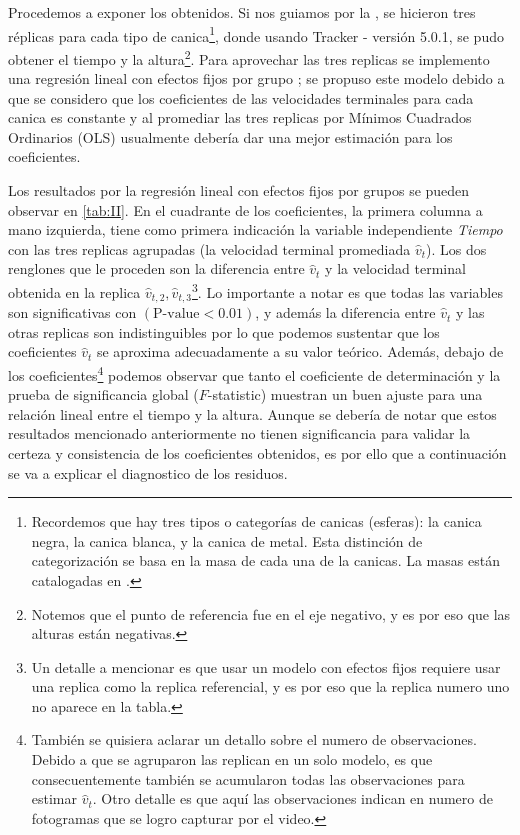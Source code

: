 \documentclass[12pt,a4paper]{config/myConfig}
\newcommand{\Trackercode}{Tracker - versión 5.0.1}
\begin{document}
\indent Procedemos a exponer los  obtenidos. Si nos guiamos por la , se hicieron tres réplicas para cada tipo de canica\footnote{Recordemos que hay tres tipos o categorías de canicas (esferas): la canica negra, la canica blanca, y la canica de metal. Esta distinción de categorización se basa en la masa de cada una de la canicas. La masas están catalogadas en .}, donde usando \Trackercode,  se pudo obtener el tiempo y la altura\footnote{Notemos que el punto de referencia fue en el eje negativo, y es por eso que las alturas están negativas.}. Para aprovechar las tres replicas se implemento una regresión lineal con efectos fijos por grupo \citet{christensen2020analysis}; se propuso este modelo debido a que se considero que los coeficientes de las velocidades terminales para cada canica es constante y al promediar las tres replicas por Mínimos Cuadrados Ordinarios (OLS) usualmente debería dar una mejor estimación para los coeficientes.\newline

\indent Los resultados por la regresión lineal con efectos fijos por grupos se pueden observar en \cref{tab:II}. En el cuadrante de los coeficientes, la primera columna a mano izquierda, tiene como primera indicación la variable independiente \textit{Tiempo} con las tres replicas agrupadas (la velocidad terminal promediada $\hat{v}_t$). Los dos renglones que le proceden son la diferencia entre $\hat{v}_t$ y la velocidad terminal obtenida en la replica $\hat{v}_{t,2}, \hat{v}_{t,3}$\footnote{Un detalle a mencionar es que usar un modelo con efectos fijos requiere usar una replica como la replica referencial, y es por eso que la replica numero uno no aparece en la tabla.}. Lo importante a notar es que todas las variables son significativas con $(\text{P-value}<0.01)$, y además la diferencia entre $\hat{v}_t$ y las otras replicas son indistinguibles por lo que podemos sustentar que los coeficientes $\hat{v}_t$ se aproxima adecuadamente a su valor teórico. Además, debajo de los coeficientes\footnote{También se quisiera aclarar un detallo sobre el numero de observaciones. Debido a que se agruparon las replican en un solo modelo, es que consecuentemente también se acumularon todas las observaciones para estimar $\hat{v}_t$.  Otro detalle es que aquí las observaciones indican en numero de fotogramas que se logro capturar por el video.} podemos observar que tanto el coeficiente de determinación y la prueba de significancia global ($F$-statistic) muestran un buen ajuste para una relación lineal entre el tiempo y la altura. Aunque se debería de notar que estos resultados mencionado anteriormente no tienen significancia para validar la certeza y consistencia de los coeficientes obtenidos, es por ello que a continuación se va a explicar el diagnostico de los residuos. \newline
\end{document}
